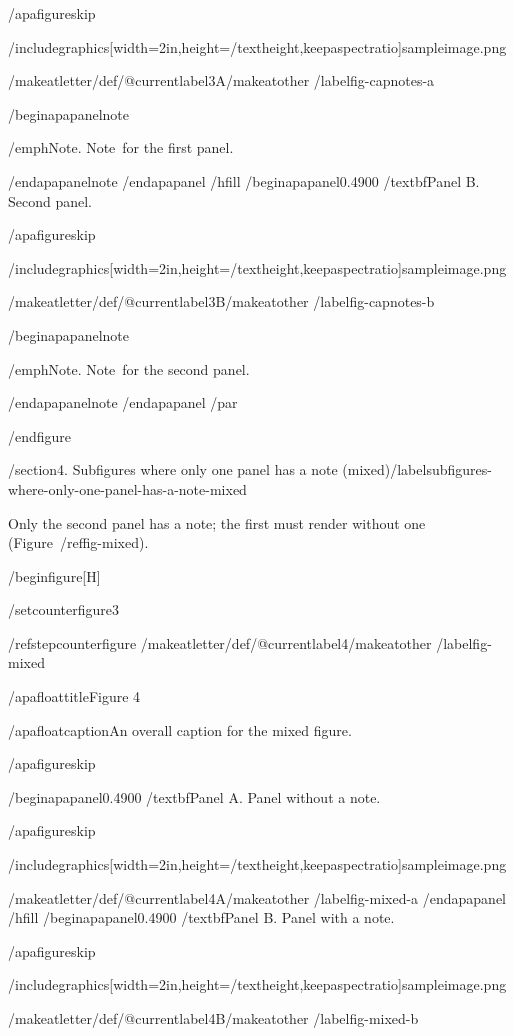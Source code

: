 /apafigureskip

/includegraphics[width=2in,height=/textheight,keepaspectratio]{sampleimage.png}

/makeatletter/def/@currentlabel{3A}/makeatother%
/label{fig-capnotes-a}

/begin{apapanelnote}

/emph{Note}. Note~for the first panel.

/end{apapanelnote}
/end{apapanel}%
/hfill
/begin{apapanel}{0.4900}%
/textbf{Panel B}. Second panel.

/apafigureskip

/includegraphics[width=2in,height=/textheight,keepaspectratio]{sampleimage.png}

/makeatletter/def/@currentlabel{3B}/makeatother%
/label{fig-capnotes-b}

/begin{apapanelnote}

/emph{Note}. Note~for the second panel.

/end{apapanelnote}
/end{apapanel}%
/par

/end{figure}

/section{4. Subfigures where only one panel has a note
(mixed)}/label{subfigures-where-only-one-panel-has-a-note-mixed}

Only the second panel has a note; the first must render without one
(Figure~/ref{fig-mixed}).

/begin{figure}[H]

/setcounter{figure}{3}

/refstepcounter{figure}%
/makeatletter/def/@currentlabel{4}/makeatother%
/label{fig-mixed}

/apafloattitle{Figure 4}

/apafloatcaption{An overall caption for the mixed figure.}

/apafigureskip

/begin{apapanel}{0.4900}%
/textbf{Panel A}. Panel without a note.

/apafigureskip

/includegraphics[width=2in,height=/textheight,keepaspectratio]{sampleimage.png}

/makeatletter/def/@currentlabel{4A}/makeatother%
/label{fig-mixed-a}
/end{apapanel}%
/hfill
/begin{apapanel}{0.4900}%
/textbf{Panel B}. Panel with a note.

/apafigureskip

/includegraphics[width=2in,height=/textheight,keepaspectratio]{sampleimage.png}

/makeatletter/def/@currentlabel{4B}/makeatother%
/label{fig-mixed-b}


